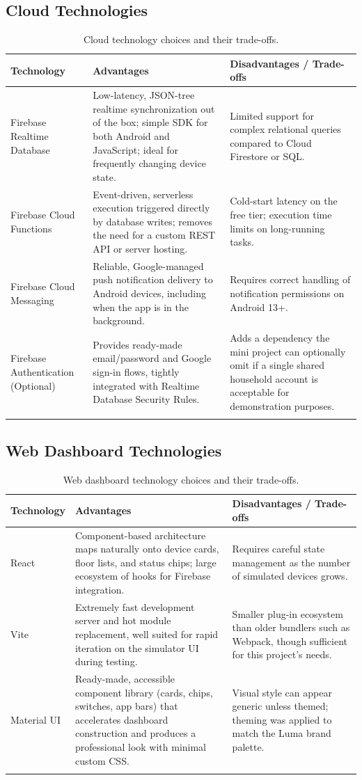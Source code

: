 \documentclass[11pt,a4paper]{article}
\begin{document}
\subsection{Cloud Technologies}
\begin{longtable}{@{}p{3.6cm}p{5.2cm}p{4.2cm}@{}}
\toprule
\textbf{Technology} & \textbf{Advantages} & \textbf{Disadvantages / Trade-offs} \\
\midrule
\endhead
Firebase Realtime Database & Low-latency, JSON-tree realtime synchronization out of the box; simple SDK for both Android and JavaScript; ideal for frequently changing device state. & Limited support for complex relational queries compared to Cloud Firestore or SQL. \\
Firebase Cloud Functions & Event-driven, serverless execution triggered directly by database writes; removes the need for a custom REST API or server hosting. & Cold-start latency on the free tier; execution time limits on long-running tasks. \\
Firebase Cloud Messaging & Reliable, Google-managed push notification delivery to Android devices, including when the app is in the background. & Requires correct handling of notification permissions on Android 13+. \\
Firebase Authentication (Optional) & Provides ready-made email/password and Google sign-in flows, tightly integrated with Realtime Database Security Rules. & Adds a dependency the mini project can optionally omit if a single shared household account is acceptable for demonstration purposes. \\
\bottomrule
\caption{Cloud technology choices and their trade-offs.}
\label{tab:cloud-tech}
\end{longtable}

\subsection{Web Dashboard Technologies}
\begin{longtable}{@{}p{2.6cm}p{5.4cm}p{5cm}@{}}
\toprule
\textbf{Technology} & \textbf{Advantages} & \textbf{Disadvantages / Trade-offs} \\
\midrule
\endhead
React & Component-based architecture maps naturally onto device cards, floor lists, and status chips; large ecosystem of hooks for Firebase integration. & Requires careful state management as the number of simulated devices grows. \\
Vite & Extremely fast development server and hot module replacement, well suited for rapid iteration on the simulator UI during testing. & Smaller plug-in ecosystem than older bundlers such as Webpack, though sufficient for this project's needs. \\
Material UI & Ready-made, accessible component library (cards, chips, switches, app bars) that accelerates dashboard construction and produces a professional look with minimal custom CSS. & Visual style can appear generic unless themed; theming was applied to match the Luma brand palette. \\
\bottomrule
\caption{Web dashboard technology choices and their trade-offs.}
\label{tab:web-tech}
\end{longtable}
\end{document}
